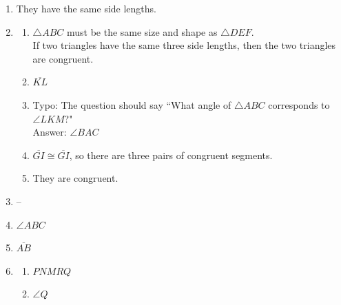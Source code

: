 \documentclass{article}
\begin{document}
\begin{enumerate}
\begin{enumerate}
	\item If point $P$ is equidistant from the coordinate axes, then point $P$ is on the line $y = x$.
	
	\item No
	
	\item Answers may vary. If quadrilateral $ABCD$ is a square, then quadrilateral $ABCD$ is a rectangle.
	
	\item Answers may vary. If quadrilateral $ABC$ has four right angles, then quadrilateral $ABCD$ is a rectangle.
	
	\end{enumerate}
	
\item They have the same side lengths.

\item
	\begin{enumerate}
	
	\item $\triangle ABC$ must be the same size and shape as $\triangle DEF$. \\
		If two triangles have the same three side lengths, then the two triangles are congruent.
	
	\item $\overline{KL}$
	
	\item Typo: The question should say ``What angle of $\triangle ABC$ corresponds to $\angle LKM$?" \\
		Answer: $\angle BAC$
		
	\item $\overline{GI} \cong \overline{GI}$, so there are three pairs of congruent segments.
	
	\item They are congruent.
	
	\end{enumerate}
	
\item --

\item $\angle ABC$

\item $\overline{AB}$

\item 
	\begin{enumerate}
	
	\item $PNMRQ$
	
	\item $\angle Q$
	

\end{enumerate}
\end{enumerate}
\end{document}
